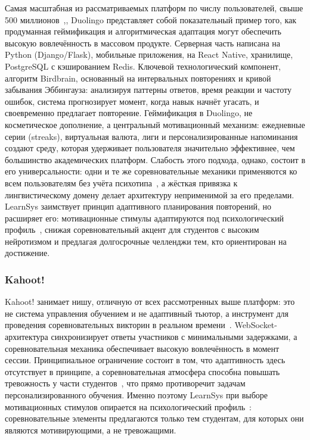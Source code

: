 Самая масштабная из рассматриваемых платформ по числу
пользователей, свыше 500 миллионов~\cite{duolingo2026official,
dominguez2013gamifying},, Duolingo представляет собой
показательный пример того, как продуманная геймификация
и алгоритмическая адаптация могут обеспечить высокую
вовлечённость в массовом продукте. Серверная часть написана
на Python (Django/Flask), мобильные приложения, на React
Native, хранилище, PostgreSQL с кэшированием Redis.
Ключевой технологический компонент, алгоритм Birdbrain,
основанный на интервальных повторениях и кривой забывания
Эббингауза: анализируя паттерны ответов, время реакции и
частоту ошибок, система прогнозирует момент, когда навык
начнёт угасать, и своевременно предлагает повторение.
Геймификация в Duolingo, не косметическое дополнение,
а центральный мотивационный механизм: ежедневные серии
(streaks), виртуальная валюта, лиги и персонализированные
напоминания~\cite{plass2015foundations} создают среду,
которая удерживает пользователя значительно эффективнее,
чем большинство академических платформ. Слабость этого
подхода, однако, состоит в его универсальности: одни и те
же соревновательные механики применяются ко всем пользователям
без учёта психотипа~\cite{bartle1996players}, а жёсткая
привязка к лингвистическому домену делает архитектуру
неприменимой за его пределами. LearnSys заимствует принцип
адаптивного планирования повторений, но расширяет его:
мотивационные стимулы адаптируются под психологический
профиль~\cite{plass2015foundations}, снижая соревновательный
акцент для студентов с высоким нейротизмом и предлагая
долгосрочные челленджи тем, кто ориентирован на достижение.

\subsubsection{Kahoot!}

Kahoot! занимает нишу, отличную от всех рассмотренных
выше платформ: это не система управления обучением и не
адаптивный тьютор, а инструмент для проведения
соревновательных викторин в реальном
времени~\cite{kahoot2026official, dominguez2013gamifying}.
WebSocket-архитектура синхронизирует ответы участников с
минимальными задержками, а соревновательная механика
обеспечивает высокую вовлечённость в момент сессии.
Принципиальное ограничение состоит в том, что адаптивность
здесь отсутствует в принципе, а соревновательная атмосфера
способна повышать тревожность у части студентов~\cite{kahoot2026official},
что прямо противоречит задачам персонализированного обучения.
Именно поэтому LearnSys при выборе мотивационных стимулов
опирается на психологический профиль~\cite{plass2015foundations}:
соревновательные элементы предлагаются только тем студентам,
для которых они являются мотивирующими, а не тревожащими.

